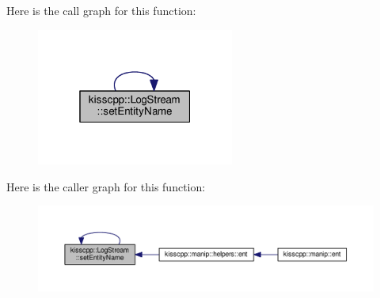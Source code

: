 Here is the call graph for this function\-:
\nopagebreak
\begin{figure}[H]
\begin{center}
\leavevmode
\includegraphics[width=184pt]{classkisscpp_1_1_log_stream_a2eb0e6909fbdce8648f349dde4b3330c_cgraph}
\end{center}
\end{figure}




Here is the caller graph for this function\-:
\nopagebreak
\begin{figure}[H]
\begin{center}
\leavevmode
\includegraphics[width=350pt]{classkisscpp_1_1_log_stream_a2eb0e6909fbdce8648f349dde4b3330c_icgraph}
\end{center}
\end{figure}


